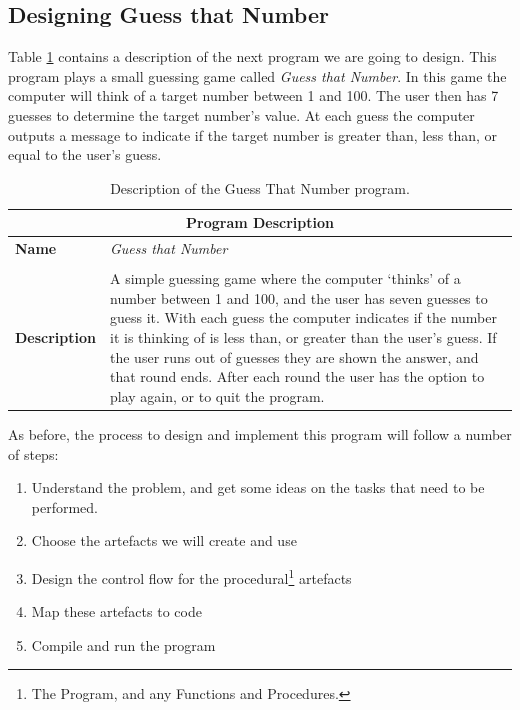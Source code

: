 \subsection{Designing Guess that Number} %
\label{sub:designing_guess_that_number}

Table \ref{tbl:control-flow-prog} contains a description of the next program we are going to design. This program plays a small guessing game called \emph{Guess that Number}. In this game the computer will think of a target number between 1 and 100. The user then has 7 guesses to determine the target number's value. At each guess the computer outputs a message to indicate if the target number is greater than, less than, or equal to the user's guess.

\begin{table}[h]
\centering
\begin{tabular}{l|p{10cm}}
  \hline
  \multicolumn{2}{c}{\textbf{Program Description}} \\
  \hline
  \textbf{Name} & \emph{Guess that Number} \\
  \\
  \textbf{Description} & A simple guessing game where the computer `thinks' of a number between 1 and 100, and the user has seven guesses to guess it. With each guess the computer indicates if the number it is thinking of is less than, or greater than the user's guess. If the user runs out of guesses they are shown the answer, and that round ends. After each round the user has the option to play again, or to quit the program.\\
  \hline
\end{tabular}
\caption{Description of the Guess That Number program.}
\label{tbl:control-flow-prog}
\end{table}

As before, the process to design and implement this program will follow a number of steps:
\begin{enumerate}
  \item Understand the problem, and get some ideas on the tasks that need to be performed.
  \item Choose the artefacts we will create and use
  \item Design the control flow for the procedural\footnote{The Program, and any Functions and Procedures.} artefacts
  \item Map these artefacts to code
  \item Compile and run the program
\end{enumerate}

